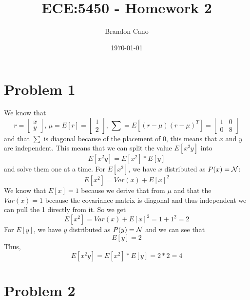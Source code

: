 \documentclass[12pt]{article}
\title{ECE:5450 - Homework 2}
\author{Brandon Cano}
\date{\today}
\begin{document}
\maketitle

\section*{Problem 1}

We know that
\[
r = \begin{bmatrix}
x \\
y
\end{bmatrix},\,
\mu = E[r] = \begin{bmatrix}
1 \\
2
\end{bmatrix},\,
\sum = E\left[(r - \mu)(r - \mu)^{T}\right]= \begin{bmatrix}
1 & 0 \\
0 & 8
\end{bmatrix}
\]
and that $\sum$ is diagonal because of the placement of 0, this means that $x$ and $y$ are independent.
This means that we can split the value $E[x^{2}y]$ into
\[ E[x^{2}y] = E[x^{2}] * E[y] \]
and solve them one at a time.
For $E[x^{2}]$, we have $x$ distributed as $P(x) = \cal{N}$:
\[ 
E[x^{2}] = Var(x) + E[x]^{2}
\]
We know that $E[x] = 1$ because we derive that from $\mu$ and that the $Var(x) = 1$ because the covariance matrix is diagonal and thus independent we can pull the 1 directly from it. 
So we get
\[ 
E[x^{2}] = Var(x) + E[x]^{2} = 1 + 1^{2} = 2
\]
For $E[y]$, we have $y$ distributed as $P(y) = \cal{N}$ and we can see that 
\[
E[y] = 2
\]
Thus,
\[
E[x^{2}y] = E[x^{2}] * E[y] = 2 * 2 = \boxed{4}
\]

\section*{Problem 2}
\end{document}
